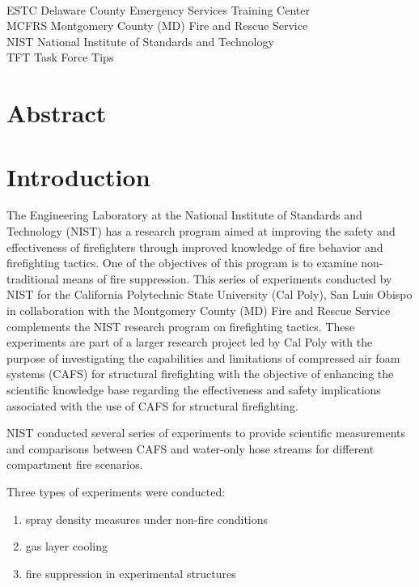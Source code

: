 \documentclass[12pt,oneside]{book}
\begin{document}
\begin{tabbing}
\hspace{1.5in} \= \\
ESTC \> Delaware County Emergency Services Training Center \\
MCFRS \> Montgomery County (MD) Fire and Rescue Service \\
NIST \> National Institute of Standards and Technology \\
TFT \> Task Force Tips \\
\end{tabbing}

\mainmatter

\chapter*{\centering Abstract}


\chapter{Introduction}
\label{chap:Introduction}
\setcounter{page}{1}

The Engineering Laboratory at the National Institute of Standards and Technology (NIST) has a research program aimed at improving the safety and effectiveness of firefighters through improved knowledge of fire behavior and firefighting tactics. One of the objectives of this program is to examine non-traditional means of fire suppression. This series of experiments conducted by NIST for the California Polytechnic State University (Cal Poly), San Luis Obispo in collaboration with the Montgomery County (MD) Fire and Rescue Service complements the NIST research program on firefighting tactics. These experiments are part of a larger research project led by Cal Poly with the purpose of investigating the capabilities and limitations of compressed air foam systems (CAFS) for structural firefighting with the objective of enhancing the scientific knowledge base regarding the effectiveness and safety implications associated with the use of CAFS for structural firefighting.

NIST conducted several series of experiments to provide scientific measurements and comparisons between CAFS and water-only hose streams for different compartment fire scenarios.

Three types of experiments were conducted:
\begin{enumerate}
\item spray density measures under non-fire conditions
\item gas layer cooling
\item fire suppression in experimental structures
\end{enumerate}
\end{document}
